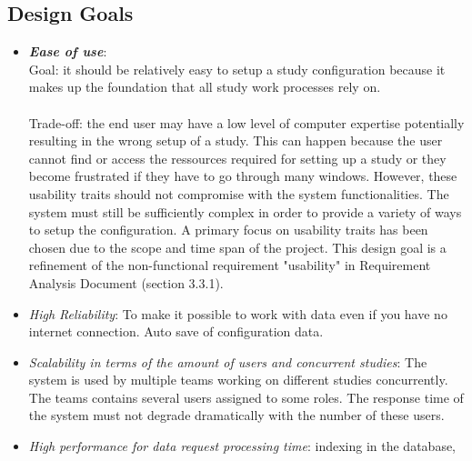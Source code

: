 \subsection{Design Goals}

\begin{itemize}
\item \textit{\bf{Ease of use}}: 
\\
Goal: it should be relatively easy to setup a study configuration because it makes up the foundation that all study work processes rely on. 
\\\\
Trade-off: the end user may have a low level of computer expertise potentially resulting in the wrong setup of a study.  This can happen because the user cannot find or access the ressources required for setting up a study or they become frustrated if they have to go through many windows. However, these usability traits should not compromise with the system functionalities. The system must still be sufficiently complex in order to provide a variety of ways to setup the configuration.  A primary focus on usability traits has been chosen due to the scope and time span of the project. This design goal is a refinement of the non-functional requirement  "usability" in Requirement Analysis Document  (section 3.3.1). 
\item \textit{High Reliability}: To make it possible to work with data even if you have no internet connection. Auto save of configuration data.
\item \textit{Scalability in terms of the amount of users and concurrent studies}: The system is used by multiple teams working on different studies concurrently. The teams contains several users assigned to some roles. The response time of the system must not degrade dramatically with the number of these users.

\item \textit{High performance for data request processing time}: indexing in the database, 
\end{itemize}